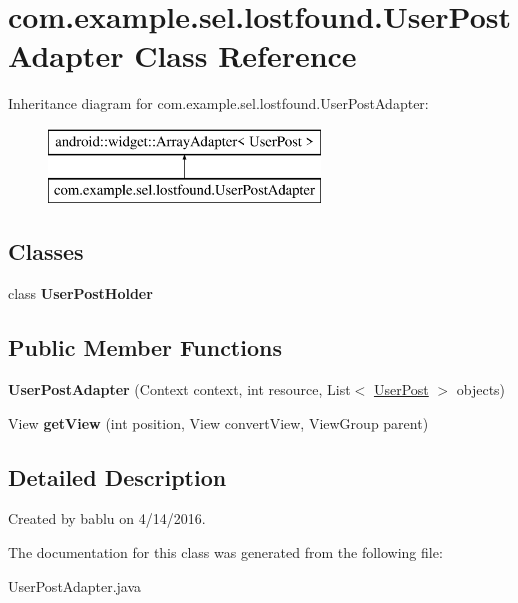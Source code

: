 \hypertarget{classcom_1_1example_1_1sel_1_1lostfound_1_1UserPostAdapter}{}\section{com.\+example.\+sel.\+lostfound.\+User\+Post\+Adapter Class Reference}
\label{classcom_1_1example_1_1sel_1_1lostfound_1_1UserPostAdapter}
Inheritance diagram for com.\+example.\+sel.\+lostfound.\+User\+Post\+Adapter\+:\begin{figure}[H]
\begin{center}
\leavevmode
\includegraphics[height=2.000000cm]{classcom_1_1example_1_1sel_1_1lostfound_1_1UserPostAdapter}
\end{center}
\end{figure}
\subsection*{Classes}
\begin{DoxyCompactItemize}
\item 
class {\bfseries User\+Post\+Holder}
\end{DoxyCompactItemize}
\subsection*{Public Member Functions}
\begin{DoxyCompactItemize}
\item 
{\bfseries User\+Post\+Adapter} (Context context, int resource, List$<$ \hyperlink{classcom_1_1example_1_1sel_1_1lostfound_1_1UserPost}{User\+Post} $>$ objects)\hypertarget{classcom_1_1example_1_1sel_1_1lostfound_1_1UserPostAdapter_a8770784429d0552a7472193206396700}{}\label{classcom_1_1example_1_1sel_1_1lostfound_1_1UserPostAdapter_a8770784429d0552a7472193206396700}

\item 
View {\bfseries get\+View} (int position, View convert\+View, View\+Group parent)\hypertarget{classcom_1_1example_1_1sel_1_1lostfound_1_1UserPostAdapter_ab3b3a8f8ee3bb0bf9a8a863209009395}{}\label{classcom_1_1example_1_1sel_1_1lostfound_1_1UserPostAdapter_ab3b3a8f8ee3bb0bf9a8a863209009395}

\end{DoxyCompactItemize}


\subsection{Detailed Description}
Created by bablu on 4/14/2016. 

The documentation for this class was generated from the following file\+:\begin{DoxyCompactItemize}
\item 
User\+Post\+Adapter.\+java\end{DoxyCompactItemize}
